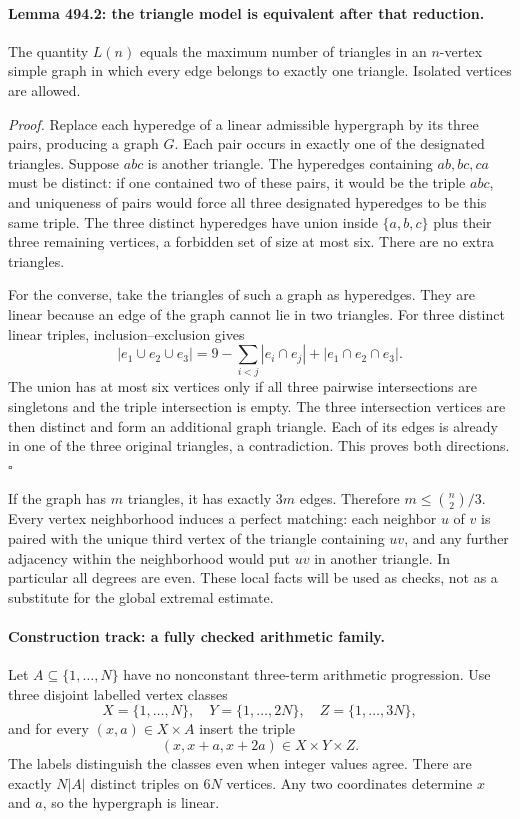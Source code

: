 \documentclass[11pt]{article}
\begin{document}
\paragraph{Lemma 494.2: the triangle model is equivalent after that reduction.}
The quantity $L(n)$ equals the maximum number of triangles in an $n$-vertex
simple graph in which every edge belongs to exactly one triangle. Isolated
vertices are allowed.

\emph{Proof.} Replace each hyperedge of a linear admissible hypergraph
by its three pairs, producing a graph $G$. Each pair occurs in exactly one
of the designated triangles. Suppose $abc$ is another triangle. The
hyperedges containing $ab,bc,ca$ must be distinct: if one contained two of
these pairs, it would be the triple $abc$, and uniqueness of pairs would
force all three designated hyperedges to be this same triple. The three
distinct hyperedges have union inside $\{a,b,c\}$ plus their three remaining
vertices, a forbidden set of size at most six. There are no extra triangles.

For the converse, take the triangles of such a graph as hyperedges. They
are linear because an edge of the graph cannot lie in two triangles.
For three distinct linear triples, inclusion--exclusion gives
\[
 |e_1\cup e_2\cup e_3|
 =9-\sum_{i<j}|e_i\cap e_j|+|e_1\cap e_2\cap e_3|.
\]
The union has at most six vertices only if all three pairwise intersections
are singletons and the triple intersection is empty. The three intersection
vertices are then distinct and form an additional graph triangle. Each of
its edges is already in one of the three original triangles, a contradiction.
This proves both directions.\hfill$\square$

If the graph has $m$ triangles, it has exactly $3m$ edges. Therefore
$m\leq\binom n2/3$. Every vertex neighborhood induces a perfect matching:
each neighbor $u$ of $v$ is paired with the unique third vertex of the
triangle containing $uv$, and any further adjacency within the neighborhood
would put $uv$ in another triangle. In particular all degrees are even.
These local facts will be used as checks, not as a substitute for the
global extremal estimate.

\paragraph{Construction track: a fully checked arithmetic family.}
Let $A\subseteq\{1,\ldots,N\}$ have no nonconstant three-term arithmetic
progression. Use three disjoint labelled vertex classes
\[
 X=\{1,\ldots,N\},\quad Y=\{1,\ldots,2N\},\quad
 Z=\{1,\ldots,3N\},
\]
and for every $(x,a)\in X\times A$ insert the triple
\begin{equation}\label{a494:arithmetic}
                   (x,x+a,x+2a)\in X\times Y\times Z.
\end{equation}
The labels distinguish the classes even when integer values agree. There
are exactly $N|A|$ distinct triples on $6N$ vertices. Any two coordinates
determine $x$ and $a$, so the hypergraph is linear.
\end{document}
